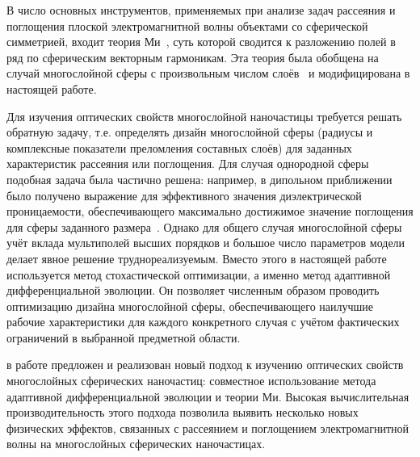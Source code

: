 {\methods} В число основных инструментов, применяемых при анализе задач
рассеяния и поглощения плоской электромагнитной волны объектами со
сферической симметрией, входит теория Ми~\cite{Mie-1908}, суть которой
сводится к разложению полей в ряд по сферическим векторным
гармоникам. Эта теория была обобщена на случай многослойной сферы с
произвольным числом слоёв~\cite{Yang-2003, Pena-scattnlay-2009} и
модифицирована в настоящей работе. %

Для изучения оптических свойств многослойной наночастицы требуется
решать обратную задачу, т.е. определять дизайн многослойной сферы
(радиусы и комплексные показатели преломления составных слоёв) для
заданных характеристик рассеяния или поглощения. Для случая однородной
сферы подобная задача была частично решена: например, в дипольном
приближении было получено выражение для эффективного значения
диэлектрической проницаемости, обеспечивающего максимально достижимое
значение поглощения для сферы заданного
размера~\cite{Grigoriev-2015}. Однако для общего случая многослойной
сферы учёт вклада мультиполей высших порядков и большое число
параметров модели делает явное решение труднореализуемым. Вместо этого
в настоящей работе используется метод стохастической оптимизации, а
именно метод адаптивной дифференциальной эволюции. Он позволяет
численным образом проводить оптимизацию дизайна многослойной сферы,
обеспечивающего наилучшие рабочие характеристики для каждого
конкретного случая с учётом фактических ограничений в выбранной
предметной области.

{\novelty} в работе предложен и реализован новый подход к изучению
оптических свойств многослойных сферических наночастиц: совместное
использование метода адаптивной дифференциальной эволюции и теории Ми.
Высокая вычислительная производительность этого подхода позволила
выявить несколько новых физических эффектов, связанных с рассеянием и
поглощением электромагнитной волны на многослойных сферических
наночастицах.


